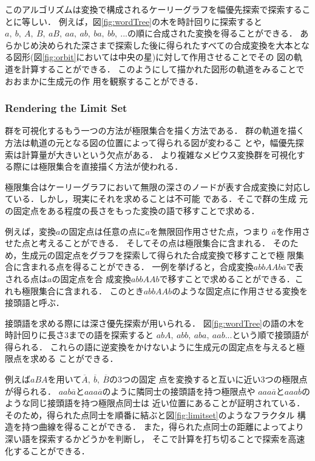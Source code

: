 このアルゴリズムは変換で構成されるケーリーグラフを幅優先探索で探索するこ
とに等しい．
例えば，図\ref{fig:wordTree}の木を時計回りに探索すると$a,~b,~A,~B,~
aB,~aa,~ab,~ba,~bb,~...$の順に合成された変換を得ることができる．
あらかじめ決められた深さまで探索した後に得られたすべての合成変換を大本とな
る図形(図\ref{fig:orbit}においては中央の星)に対して作用させることでその
図の軌道を計算することができる．
このようにして描かれた図形の軌道をみることでおおまかに生成元の作
用を観察することができる．

\subsubsection{Rendering the Limit Set}

群を可視化するもう一つの方法が極限集合を描く方法である．
群の軌道を描く方法は軌道の元となる図の位置によって得られる図が変わるこ
とや，幅優先探索は計算量が大きいという欠点がある．
より複雑なメビウス変換群を可視化する際には極限集合を直接描く方法が使われる．

極限集合はケーリーグラフにおいて無限の深さのノードが表す合成変換に対応し
ている．しかし，現実にそれを求めることは不可能 である．そこで群の生成
元の固定点をある程度の長さをもった変換の語で移すことで求める．

例えば，変換$a$の固定点は任意の点に$a$を無限回作用させた点，つまり
$\overline{a}$を作用させた点と考えることができる．
そしてその点は極限集合に含まれる．
そのため，生成元の固定点をグラフを探索して得られた合成変換で移すことで極
限集合に含まれる点を得ることができる．
一例を挙げると，合成変換$abbAAb\overline{a}$で表される点は$a$の固定点を合
成変換$abbAAb$で移すことで求めることができる．これも極限集合に含まれる．
このとき$abbAAb$のような固定点に作用させる変換を接頭語と呼ぶ．

接頭語を求める際には深さ優先探索が用いられる．
図\ref{fig:wordTree}の語の木を時計回りに長さ3までの語を探索すると
$abA,~abb,~aba,~aab ...$という順で接頭語が得られる．
これらの語に逆変換をかけないように生成元の固定点を与えると極限点を求める
ことができる．

例えば$aBA$を用いて$\overline{A},~\overline{b},~\overline{B}$の3つの固定
点を変換すると互いに近い3つの極限点が得られる．
$aab\overline{a}$と$aaa\overline{a}$のように隣同士の接頭語を持つ極限点や
$aaa\overline{a}$と$aaa\overline{b}$のような同じ接頭語を持つ極限点同士は
近い位置にあることが証明されている．
そのため，得られた点同士を順番に結ぶと図\ref{fig:limitset}のようなフラクタル
構造を持つ曲線を得ることができる．
また，得られた点同士の距離によってより深い語を探索するかどうかを判断し，
そこで計算を打ち切ることで探索を高速化することができる．

